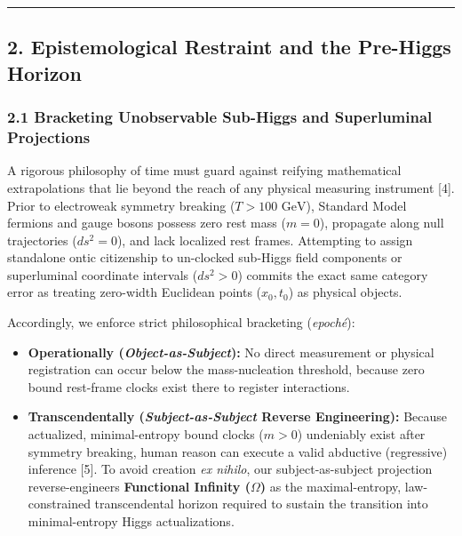 \documentclass[
]{article}
\providecommand{\tightlist}{%
  \setlength{\itemsep}{0pt}\setlength{\parskip}{0pt}}
\begin{document}
\begin{center}\rule{0.5\linewidth}{0.5pt}\end{center}

\subsection{2. Epistemological Restraint and the Pre-Higgs
Horizon}\label{epistemological-restraint-and-the-pre-higgs-horizon}

\subsubsection{2.1 Bracketing Unobservable Sub-Higgs and Superluminal
Projections}\label{bracketing-unobservable-sub-higgs-and-superluminal-projections}

A rigorous philosophy of time must guard against reifying mathematical
extrapolations that lie beyond the reach of any physical measuring
instrument {[}4{]}. Prior to electroweak symmetry breaking
(\(T > 100\text{ GeV}\)), Standard Model fermions and gauge bosons
possess zero rest mass (\(m = 0\)), propagate along null trajectories
(\(ds^2 = 0\)), and lack localized rest frames. Attempting to assign
standalone ontic citizenship to un-clocked sub-Higgs field components or
superluminal coordinate intervals (\(ds^2 > 0\)) commits the exact same
category error as treating zero-width Euclidean points (\(x_0, t_0\)) as
physical objects.

Accordingly, we enforce strict philosophical bracketing (\emph{epoché}):

\begin{itemize}
\tightlist
\item
  \textbf{Operationally (\emph{Object-as-Subject}):} No direct
  measurement or physical registration can occur below the
  mass-nucleation threshold, because zero bound rest-frame clocks exist
  there to register interactions.
\item
  \textbf{Transcendentally (\emph{Subject-as-Subject} Reverse
  Engineering):} Because actualized, minimal-entropy bound clocks
  (\(m > 0\)) undeniably exist after symmetry breaking, human reason can
  execute a valid abductive (regressive) inference {[}5{]}. To avoid
  creation \emph{ex nihilo}, our subject-as-subject projection
  reverse-engineers \textbf{Functional Infinity (\(\Omega\))} as the
  maximal-entropy, law-constrained transcendental horizon required to
  sustain the transition into minimal-entropy Higgs actualizations.
\end{itemize}
\end{document}
